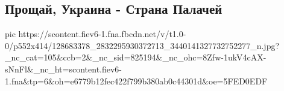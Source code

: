  
 
 
 
 

\subsection{Прощай, Украина - Страна Палачей}
\label{sec:30_11_2020.fb.shilnikovskii_nikolai.1.donbass_rus}

\ifcmt
pic https://scontent.fiev6-1.fna.fbcdn.net/v/t1.0-0/p552x414/128683378_2832295930372713_3440141327732752277_n.jpg?_nc_cat=105&ccb=2&_nc_sid=825194&_nc_ohc=8Zfw-1ukV4cAX-sNnFl&_nc_ht=scontent.fiev6-1.fna&tp=6&oh=e6779b12fec422f799b380ab0c44301d&oe=5FED0EDF
\fi
